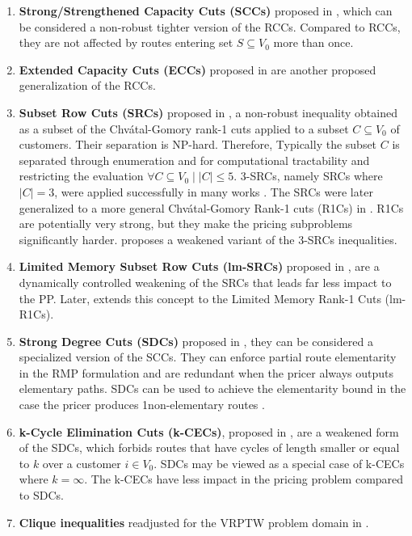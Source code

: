 \begin{enumerate}
	\setlength{\itemsep}{0pt}
	\setlength{\parskip}{0pt}

	\item \textbf{Strong/Strengthened Capacity Cuts (SCCs)} proposed in \textcite{baldacci2008},
	      which can be considered a non-robust tighter version of the RCCs.
	      Compared to RCCs, they are not affected by routes entering set $S \subseteq V_0$ more than once.
	\item \textbf{Extended Capacity Cuts (ECCs)} proposed in \textcite{pessoa2008, pessoa2009}
	      are another proposed generalization of the RCCs.
	\item \textbf{Subset Row Cuts (SRCs)} proposed in \textcite{jepsen2008subsetrow}, a non-robust
	      inequality obtained as a subset of the  Chv\'atal-Gomory rank-1 cuts \parencite{chvatal1973}
	      applied to a subset $C \subseteq V_0$ of customers.
	      Their separation is NP-hard.
	      Therefore, Typically the subset $C$ is separated through enumeration
	      and for computational tractability and restricting the evaluation $\forall C \subseteq V_0 \mid |C| \le 5$.
	      3-SRCs, namely SRCs where $|C| = 3$, were applied successfully in many works \parencite{desaulniers2008, jepsen2011, baldacci2011, contardo2014, pecin2017improved}.
	      The SRCs were later generalized to a more general Chv\'atal-Gomory Rank-1 cuts (R1Cs) in \textcite{petersen2008}.
	      R1Cs are potentially very strong, but they make the pricing subproblems significantly harder.
	      \textcite{baldacci2011} proposes a weakened variant of the 3-SRCs inequalities.
	\item \textbf{Limited Memory Subset Row Cuts (lm-SRCs)} proposed in \textcite{pecin2017improved},
	      are a dynamically controlled weakening of the SRCs that leads far less impact to
	      the PP.
	      Later, \textcite{pecin2017limited} extends this concept to the Limited Memory Rank-1 Cuts (lm-R1Cs).
	\item \textbf{Strong Degree Cuts (SDCs)} proposed in \textcite{contardo2011, contardo2014}, they can be considered
	      a specialized version of the SCCs.
	      They can enforce partial route elementarity in the RMP formulation
	      and are redundant when the pricer always outputs elementary paths.
	      SDCs can be used to achieve the elementarity bound in the case
	      the pricer produces 1non-elementary routes \parencite{contardo2014}.
	\item \textbf{k-Cycle Elimination Cuts (k-CECs)}, proposed in \textcite{contardo2014},
	      are a weakened form of the SDCs, which forbids
	      routes that have cycles of length smaller or equal to $k$ over a customer $i \in V_0$.
	      SDCs may be viewed as a special case of k-CECs where $k = \infty$.
	      The k-CECs have less impact in the pricing problem compared to SDCs.
	\item \textbf{Clique inequalities} readjusted for the VRPTW problem domain in \textcite{spoorendonk2010clique}.
\end{enumerate}

